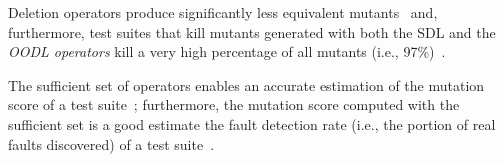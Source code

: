Deletion operators produce significantly less equivalent mutants~
\cite{delamaro2014designing,delamaro2014experimental} and, furthermore,
test suites that kill mutants generated with both the SDL and the \emph{OODL operators} kill a very high percentage of all mutants (i.e., 97\%)~\cite{delamaro2014experimental}.

%
%



The sufficient set of operators enables an accurate estimation of the mutation score of a test suite~\cite{siami2008sufficient}; furthermore, the mutation score computed with the sufficient set is a good estimate the fault detection rate (i.e., the portion of real faults discovered) of a test suite~\cite{andrews2005mutation}.

